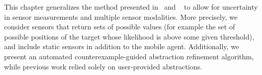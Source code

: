 This chapter generalizes the method presented in~\cite{bharadwaj2018synthesis} and ~\cite{bharadwaj2018distributed} to allow for uncertainty in sensor measurements and multiple sensor modalities. More precisely, we consider sensors that return sets of possible values (for example the set of possible positions of the target whose likelihood is above some given threshold), and include static sensors in addition to the mobile agent. Additionally, we present an automated counterexample-guided abstraction refinement algorithm, while previous work relied solely on user-provided abstractions. 






